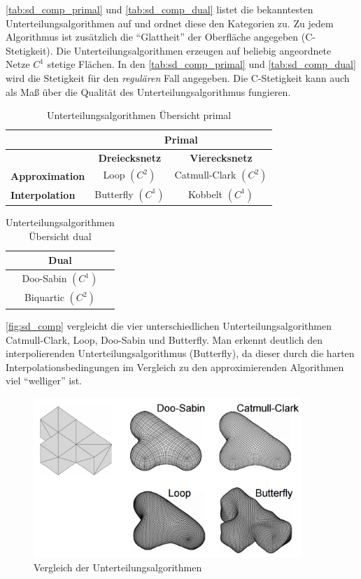 \autoref{tab:sd_comp_primal} und \autoref{tab:sd_comp_dual} listet die bekanntesten Unterteilungsalgorithmen auf und ordnet diese den Kategorien zu.
Zu jedem Algorithmus ist zusätzlich die \enquote{Glattheit} der Oberfläche angegeben (C-Stetigkeit).
Die Unterteilungsalgorithmen erzeugen auf beliebig angeordnete Netze \(C^1\) stetige Flächen.
In den \autoref{tab:sd_comp_primal} und \autoref{tab:sd_comp_dual} wird die Stetigkeit für den
\emph{regulären} Fall angegeben.
Die C-Stetigkeit kann auch als Maß über die Qualität des Unterteilungsalgorithmus fungieren.
\begin{table}
\center
\caption{Unterteilungsalgorithmen Übersicht primal \cite[S. 65]{Zorin.subdivcourse}}
\label{tab:sd_comp_primal}
\begin{tabular}{l|c|c|}
& \multicolumn{2}{c|}{\textbf{Primal}}\\
\hline
& \textbf{Dreiecksnetz} & \textbf{Vierecksnetz}\\
\hline
\textbf{Approximation} & Loop \((C^2)\) & Catmull-Clark \((C^2)\)\\
\textbf{Interpolation} & Butterfly \((C^1)\) & Kobbelt \((C^1)\)\\
\end{tabular}
\end{table}
\begin{table}
\center
\caption{Unterteilungsalgorithmen Übersicht dual \cite[S. 65]{Zorin.subdivcourse}}
\label{tab:sd_comp_dual}
\begin{tabular}{c}
\\
\hline
\textbf{Dual}\\
\hline
Doo-Sabin \((C^1)\) \\
Biquartic \((C^2)\) \\
\end{tabular}
\end{table}
\autoref{fig:sd_comp} vergleicht die vier unterschiedlichen Unterteilungsalgorithmen Catmull-Clark, Loop, Doo-Sabin und Butterfly.
Man erkennt deutlich den interpolierenden Unterteilungsalgorithmus (Butterfly),
da dieser durch die harten Interpolationsbedingungen im Vergleich zu den approximierenden Algorithmen viel \enquote{welliger} ist. \cite{Zorin.subdivcourse}
\begin{figure}
  \centering
  \includegraphics[width=0.9\textwidth]{content/media/sd_overview.png}
  \caption{Vergleich der Unterteilungsalgorithmen \cite{Standford.24.07.2015}}
  \label{fig:sd_comp}
\end{figure}

